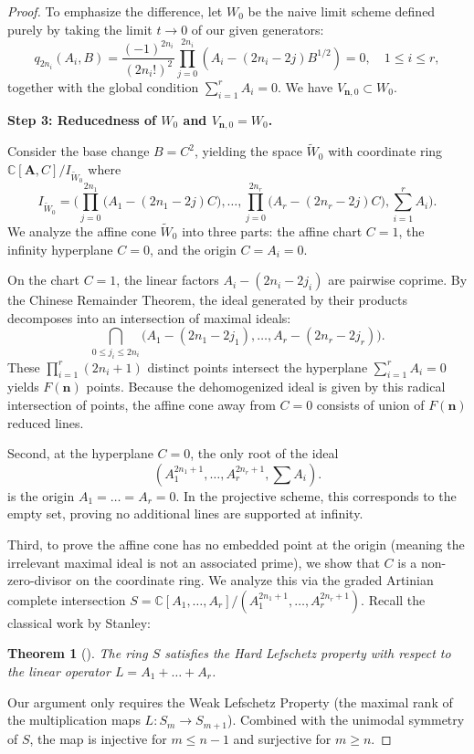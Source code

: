 \documentclass[11pt]{amsart}
\newtheorem{theorem}{Theorem}[section]
\theoremstyle{remark}
\numberwithin{equation}{section}
\begin{document}
\begin{proof}
To emphasize the difference, let $W_0$ be the naive limit scheme defined purely by taking the limit $t \rightarrow 0$ of our given generators:
\[
    q_{2n_i}(A_i, B) = \frac{(-1)^{2n_i}}{({2n_i} !)^2}\prod_{j = 0}^{2n_i} (A_i - ({2n_i} - 2j)B^{1/2})=0, \quad 1 \le i \le r,
\]
together with the global condition $\sum_{i=1}^r A_i = 0$. We have $V_{\mathbf{n},0} \subset W_0$. 

\vspace{0.5em}
\noindent \textbf{Step 3: Reducedness of $W_0$ and $V_{\mathbf{n},0} = W_0$.} 

Consider the base change $B=C^2$, yielding the space $\widetilde{W}_0$ with coordinate ring $\mathbb{C}[\mathbf{A},C]/I_{\widetilde{W}_0}$ where 
\[
    I_{\widetilde{W}_0} = \Bigg( \prod_{j=0}^{2n_1} \big(A_1-(2n_1-2j)C\big), \dots, \prod_{j=0}^{2n_r} \big(A_r-(2n_r-2j)C\big), \sum_{i=1}^r A_i \Bigg).
\]
We analyze the affine cone $\widetilde{W}_0$ into three parts: the affine chart $C=1$, the infinity hyperplane $C=0$, and the origin $C = A_i=0$.

On the chart $C=1$, the linear factors $A_i - (2n_i - 2j_i)$ are pairwise coprime. By the Chinese Remainder Theorem, the ideal generated by their products decomposes into an intersection of maximal ideals:
\[
    \bigcap_{0 \le j_i \le 2n_i} \big( A_1-(2n_1-2j_1), \dots, A_r-(2n_r-2j_r) \big).
\]
These $\prod_{i=1}^r (2n_i+1)$ distinct points intersect the hyperplane $\sum_{i=1}^r A_i = 0$ yields $F(\mathbf{n})$ points. Because the dehomogenized ideal is given by this radical intersection of points, the affine cone away from $C=0$ consists of union of $F(\mathbf{n})$ reduced lines.

Second, at the hyperplane $C=0$, the only root of the ideal
\[
(A_1^{2n_1+1}, \dots, A_r^{2n_r+1}, \sum A_i).
\] 
is the origin $A_1 = \dots = A_r = 0$. In the projective scheme, this corresponds to the empty set, proving no additional lines are supported at infinity.

Third, to prove the affine cone has no embedded point at the origin (meaning the irrelevant maximal ideal is not an associated prime), we show that $C$ is a non-zero-divisor on the coordinate ring. We analyze this via the graded Artinian complete intersection $S = \mathbb{C}[A_1,\dots,A_r]/(A_1^{2n_1+1},\dots,A_r^{2n_r+1})$. Recall the classical work by Stanley:
\begin{theorem}[\cite{Stanley_1980}]
The ring $S$ satisfies the Hard Lefschetz property with respect to the linear operator $L= A_1 + \dots + A_r$. 
\end{theorem}
Our argument only requires the Weak Lefschetz Property (the maximal rank of the multiplication maps $L: S_m \to S_{m+1}$). Combined with the unimodal symmetry of $S$, the map is injective for $m \le n-1$ and surjective for $m \ge n$. 


\end{proof}
\end{document}
